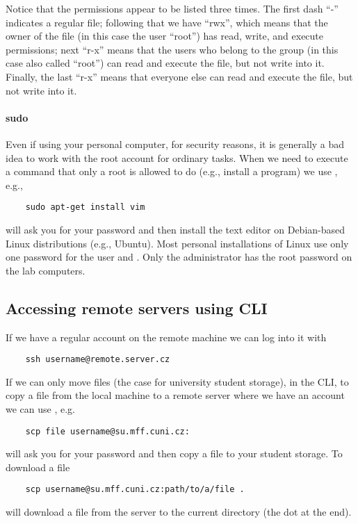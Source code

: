 Notice that the permissions appear to be listed three times. The first dash ``-'' indicates a regular file; following that we have ``rwx'', which means that the owner of the file (in this case the user ``root'') has read, write, and execute permissions; next ``r-x'' means that the users who belong to the group (in this case also called ``root'') can read and execute the file, but not write into it. Finally, the last ``r-x'' means that everyone else can read and execute the file, but not write into it.

\paragraph{sudo}

Even if using your personal computer, for security reasons, it is generally a bad idea to work with the root account for ordinary tasks. When we need to execute a command that only a root is allowed to do (e.g., install a program) we use , e.g.,
\begin{lstlisting}
    sudo apt-get install vim
\end{lstlisting}
will ask you for your password and then install the text editor  on Debian-based Linux distributions (e.g., Ubuntu). Most personal installations of Linux use only one password for the user and . Only the administrator has the root password on the lab computers.

\subsection{Accessing remote servers using CLI}
If we have a regular account on the remote machine we can log into it with
\begin{lstlisting}
    ssh username@remote.server.cz
\end{lstlisting}
If we can only move files (the case for university student storage), in the CLI, to copy a file from the local machine to a remote server where we have an account we can use , e.g.
\begin{lstlisting}
    scp file username@su.mff.cuni.cz:
\end{lstlisting}
will ask you for your password and then copy a file to your student storage. To download a file
\begin{lstlisting}
    scp username@su.mff.cuni.cz:path/to/a/file .
\end{lstlisting}
will download a file from the server to the current directory (the dot at the end).

